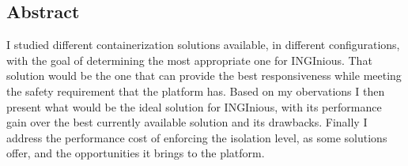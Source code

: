 \newpage
\begin{center}
  \section*{Abstract}
\end{center}

I studied different containerization solutions available, in different configurations, with the goal of determining the most appropriate one for INGInious.  That solution would be the one that can provide the best responsiveness while meeting the safety requirement that the platform has.  Based on my obervations I then present what would be the ideal solution for INGInious, with its performance gain over the best currently available solution and its drawbacks.  Finally I address the performance cost of enforcing the isolation level, as some solutions offer, and the opportunities it brings to the platform.
